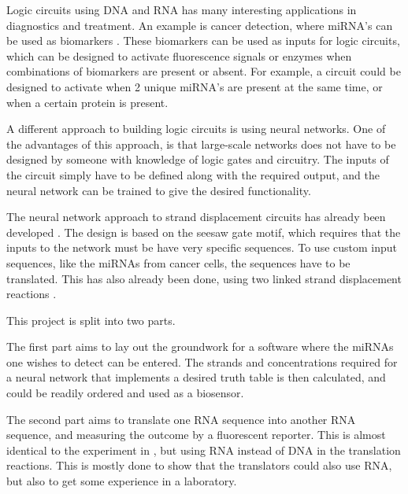 Logic circuits using DNA and RNA has many interesting applications in diagnostics and treatment. An example is cancer detection, where miRNA's can be used as biomarkers \cite{Peng2016}. These biomarkers can be used as inputs for logic circuits, which can be designed to activate fluorescence signals \cite{Seelig2006} or enzymes \cite{Engelen2016} when combinations of biomarkers are present or absent. For example, a circuit could be designed to activate when 2 unique miRNA's are present at the same time, or when a certain protein is present.

A different approach to building logic circuits is using neural networks. One of the advantages of this approach, is that large-scale networks does not have to be designed by someone with knowledge of logic gates and circuitry. The inputs of the circuit simply have to be defined along with the required output, and the neural network can be trained to give the desired functionality.

The neural network approach to strand displacement circuits has already been developed \cite{Qian2011}. The design is based on the seesaw gate motif, which requires that the inputs to the network must be have very specific sequences. To use custom input sequences, like the miRNAs from cancer cells, the sequences have to be translated. This has also already been done, using two linked strand displacement reactions \cite{Picuri2009}.

This project is split into two parts.

The first part aims to lay out the groundwork for a software where the miRNAs one wishes to detect can be entered. The strands and concentrations required for a neural network that implements a desired truth table is then calculated, and could be readily ordered and used as a biosensor.

The second part aims to translate one RNA sequence into another RNA sequence, and measuring the outcome by a fluorescent reporter. This is almost identical to the experiment in \cite{Picuri2009}, but using RNA instead of DNA in the translation reactions. This is mostly done to show that the translators could also use RNA, but also to get some experience in a laboratory.

